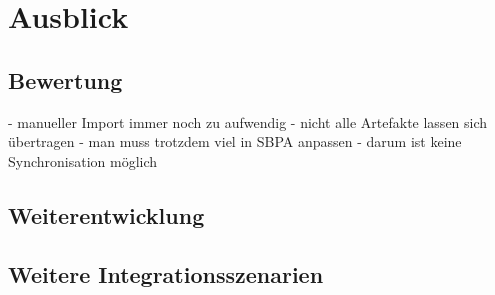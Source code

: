 \chapter{Ausblick}
    \section{Bewertung}
    - manueller Import immer noch zu aufwendig
    - nicht alle Artefakte lassen sich übertragen
        - man muss trotzdem viel in SBPA anpassen
        - darum ist keine Synchronisation möglich
    \section{Weiterentwicklung}
    \section{Weitere Integrationsszenarien}


